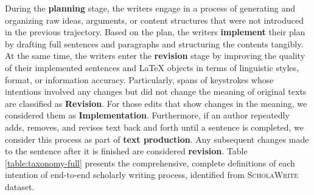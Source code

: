 During the \textbf{planning} stage, the writers engage in a process of generating and organizing raw ideas, arguments, or content structures that were not introduced in the previous trajectory. Based on the plan, the writers \textbf{implement} their plan by drafting full sentences and paragraphs and structuring the contents tangibly. At the same time, the writers enter the \textbf{revision} stage by improving the quality of their implemented sentences and LaTeX objects in terms of linguistic styles, format, or information accuracy. Particularly, spans of keystrokes whose intentions involved any changes but did not change the meaning of original texts are classified as \textbf{Revision}. For those edits that show changes in the meaning, we considered them as \textbf{Implementation}. 
Furthermore, if an author repeatedly adds, removes, and revises text back and forth until a sentence is completed, we consider this process as part of \textbf{text production}. Any subsequent changes made to the sentence after it is finished are considered \textbf{revision}. Table \ref{table:taxonomy-full} presents the comprehensive, complete definitions of each intention of end-to-end scholarly writing process, identified from \textsc{ScholaWrite} dataset. 




